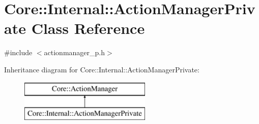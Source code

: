 \hypertarget{class_core_1_1_internal_1_1_action_manager_private}{\section{\-Core\-:\-:\-Internal\-:\-:\-Action\-Manager\-Private \-Class \-Reference}
\label{class_core_1_1_internal_1_1_action_manager_private}
}


{\ttfamily \#include $<$actionmanager\-\_\-p.\-h$>$}

\-Inheritance diagram for \-Core\-:\-:\-Internal\-:\-:\-Action\-Manager\-Private\-:\begin{figure}[H]
\begin{center}
\leavevmode
\includegraphics[height=2.000000cm]{class_core_1_1_internal_1_1_action_manager_private}
\end{center}
\end{figure}
